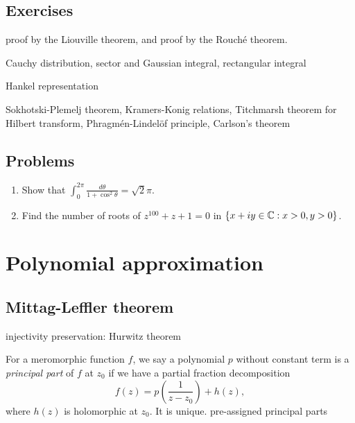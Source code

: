 \documentclass{../note}
\begin{document}
\section*{Exercises}
\begin{prb}
proof by the Liouville theorem, and proof by the Rouch\'e theorem.
\end{prb}
\begin{prb}
Cauchy distribution,
sector and Gaussian integral,
rectangular integral
\end{prb}
\begin{prb}
\end{prb}
\begin{prb}
Hankel representation
\end{prb}
\begin{prb}
\end{prb}

Sokhotski-Plemelj theorem,
Kramers-Konig relations,
Titchmarsh theorem for Hilbert transform,
Phragm\'en-Lindel\"of principle,
Carlson's theorem

\section*{Problems}
\begin{enumerate}
\item Show that $\int_0^{2\pi}\frac{d\theta}{1+\cos^2\theta}=\sqrt2\pi$.
\item Find the number of roots of $z^{100}+z+1=0$ in $\{x+iy\in\mathbb{C}:x>0,y>0\}$.
\end{enumerate}




\chapter{Polynomial approximation}
\section{Mittag-Leffler theorem}
\begin{prb}
\begin{parts}
\item injectivity preservation: Hurwitz theorem
\end{parts}
\end{prb}

\begin{prb}
For a meromorphic function $f$, we say a polynomial $p$ without constant term is a \emph{principal part} of $f$ at $z_0$ if we have a partial fraction decomposition
\[f(z)=p\left(\frac1{z-z_0}\right)+h(z),\]
where $h(z)$ is holomorphic at $z_0$.
It is unique.
pre-assigned principal parts
\end{prb}
\end{document}
